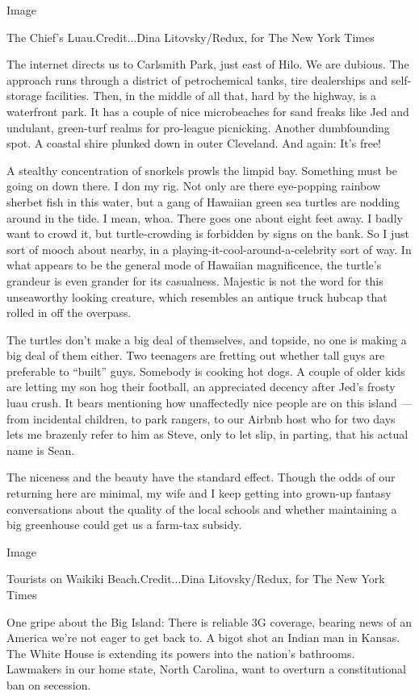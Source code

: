 Image

The Chief's Luau.Credit...Dina Litovsky/Redux, for The New York Times

The internet directs us to Carlsmith Park, just east of Hilo. We are
dubious. The approach runs through a district of petrochemical tanks,
tire dealerships and self-storage facilities. Then, in the middle of all
that, hard by the highway, is a waterfront park. It has a couple of nice
microbeaches for sand freaks like Jed and undulant, green-turf realms
for pro-league picnicking. Another dumbfounding spot. A coastal shire
plunked down in outer Cleveland. And again: It's free!

A stealthy concentration of snorkels prowls the limpid bay. Something
must be going on down there. I don my rig. Not only are there
eye-popping rainbow sherbet fish in this water, but a gang of Hawaiian
green sea turtles are nodding around in the tide. I mean, whoa. There
goes one about eight feet away. I badly want to crowd it, but
turtle-crowding is forbidden by signs on the bank. So I just sort of
mooch about nearby, in a playing-it-cool-around-a-celebrity sort of way.
In what appears to be the general mode of Hawaiian magnificence, the
turtle's grandeur is even grander for its casualness. Majestic is not
the word for this unseaworthy looking creature, which resembles an
antique truck hubcap that rolled in off the overpass.

The turtles don't make a big deal of themselves, and topside, no one is
making a big deal of them either. Two teenagers are fretting out whether
tall guys are preferable to ``built'' guys. Somebody is cooking hot
dogs. A couple of older kids are letting my son hog their football, an
appreciated decency after Jed's frosty luau crush. It bears mentioning
how unaffectedly nice people are on this island --- from incidental
children, to park rangers, to our Airbnb host who for two days lets me
brazenly refer to him as Steve, only to let slip, in parting, that his
actual name is Sean.

The niceness and the beauty have the standard effect. Though the odds of
our returning here are minimal, my wife and I keep getting into grown-up
fantasy conversations about the quality of the local schools and whether
maintaining a big greenhouse could get us a farm-tax subsidy.

Image

Tourists on Waikiki Beach.Credit...Dina Litovsky/Redux, for The New York
Times

One gripe about the Big Island: There is reliable 3G coverage, bearing
news of an America we're not eager to get back to. A bigot shot an
Indian man in Kansas. The White House is extending its powers into the
nation's bathrooms. Lawmakers in our home state, North Carolina, want to
overturn a constitutional ban on secession.


